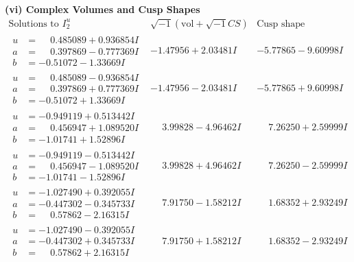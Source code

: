 \documentclass[1p]{elsarticle_modified}
\theoremstyle{definition}
\newcommand{\I}{\sqrt{-1}}
\begin{document}
\newpage\flushleft \textbf{(vi) Complex Volumes and Cusp Shapes}
$$\begin{array}{c|c|c}  
\text{Solutions to }I^u_{2}& \I (\text{vol} + \sqrt{-1}CS) & \text{Cusp shape}\\
 \hline 
\begin{aligned}
u &= \phantom{-}0.485089 + 0.936854 I \\
a &= \phantom{-}0.397869 - 0.777369 I \\
b &= -0.51072 - 1.33669 I\end{aligned}
 & -1.47956 + 2.03481 I & -5.77865 - 9.60998 I \\ \hline\begin{aligned}
u &= \phantom{-}0.485089 - 0.936854 I \\
a &= \phantom{-}0.397869 + 0.777369 I \\
b &= -0.51072 + 1.33669 I\end{aligned}
 & -1.47956 - 2.03481 I & -5.77865 + 9.60998 I \\ \hline\begin{aligned}
u &= -0.949119 + 0.513442 I \\
a &= \phantom{-}0.456947 + 1.089520 I \\
b &= -1.01741 + 1.52896 I\end{aligned}
 & \phantom{-}3.99828 - 4.96462 I & \phantom{-}7.26250 + 2.59999 I \\ \hline\begin{aligned}
u &= -0.949119 - 0.513442 I \\
a &= \phantom{-}0.456947 - 1.089520 I \\
b &= -1.01741 - 1.52896 I\end{aligned}
 & \phantom{-}3.99828 + 4.96462 I & \phantom{-}7.26250 - 2.59999 I \\ \hline\begin{aligned}
u &= -1.027490 + 0.392055 I \\
a &= -0.447302 - 0.345733 I \\
b &= \phantom{-}0.57862 - 2.16315 I\end{aligned}
 & \phantom{-}7.91750 - 1.58212 I & \phantom{-}1.68352 + 2.93249 I \\ \hline\begin{aligned}
u &= -1.027490 - 0.392055 I \\
a &= -0.447302 + 0.345733 I \\
b &= \phantom{-}0.57862 + 2.16315 I\end{aligned}
 & \phantom{-}7.91750 + 1.58212 I & \phantom{-}1.68352 - 2.93249 I \\ \hline\begin{aligned}

\end{aligned}
\end{array}$$
\end{document}
